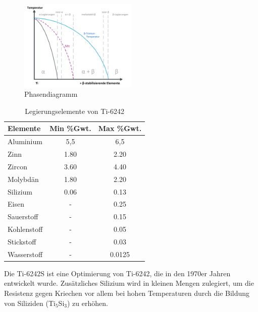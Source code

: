 \begin{figure}[H]
	\centering
	\includegraphics[width=0.5\textwidth]{Bilder/Phasendiagram}
	\caption{Phasendiagramm \cite{M.J.Donachie.2010}}
	\label{tab:PD-Ti6242}
\end{figure}





\begin{table}[h]
	
	\centering	
	\begin{tabular}{|l |c |c|}
		\hline
		\hspace{20ex}Elemente \hspace{20ex} & Min \%Gwt. & Max \%Gwt.\\
		\hline
		Aluminium&5,5&6,5\\
		Zinn&1.80&2.20\\
		Zircon&3.60&4.40\\
		Molybdän&1.80&2.20\\
		Silizium &0.06&0.13\\
		Eisen&-&0.25\\
		Sauerstoff&-&0.15\\
		Kohlenstoff&	-&	0.05\\
		Stickstoff&-&0.03\\
		Wasserstoff&-&0.0125\\
		
		
		\hline
	\end{tabular}
	\caption{Legierungselemente von Ti-6242 \cite{M.J.Donachie.2010}}
	\label{tab:Zusammensetzung}
\end{table}


Die Ti-6242S ist eine Optimierung von Ti-6242, die in den 1970er Jahren  entwickelt wurde. Zusätzliches Silizium wird in kleinen Mengen zulegiert, um die Resistenz gegen Kriechen vor allem bei hohen Temperaturen durch die Bildung von Siliziden (Ti$_5$Si$_3$) zu erhöhen.\cite{C.Leyens.2005} 


